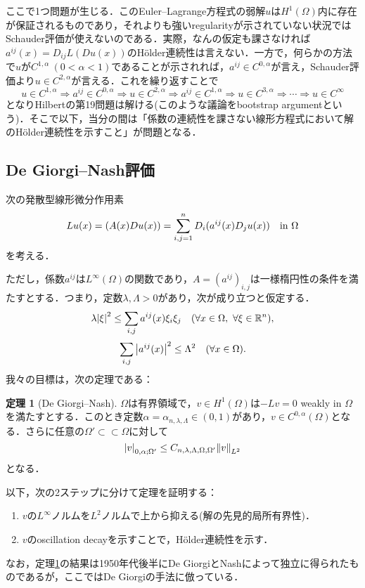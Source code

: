 \documentclass[a4paper]{ltjsarticle}
\newcommand{\Rset}{\mathbb{R}}
\newcommand{\Om}{\Omega}
\newcommand{\ssubset}{\subset\subset}
\newcommand{\inn}{\quad\text{in}\ }
\newcommand{\1}{\mathbbm{1}}
\let\div\relax
\DeclareMathOperator{\div}{\mathrm{div}}
\numberwithin{equation}{section}
\theoremstyle{definition}
\newtheorem{thm}{定理}[section]
\begin{document}
ここで1つ問題が生じる．このEuler--Lagrange方程式の弱解$u$は$H^1(\Om)$内に存在が保証されるものであり，それよりも強いregularityが示されていない状況ではSchauder評価が使えないのである．実際，なんの仮定も課さなければ$a^{ij}(x)=D_{ij}L(Du(x))$のHölder連続性は言えない．一方で，何らかの方法で$u$が$C^{1,\alpha}\ (0<\alpha<1)$であることが示されれば，$a^{ij}\in C^{0,\alpha}$が言え，Schauder評価より$u\in C^{2,\alpha}$が言える．これを繰り返すことで
\begin{equation}
    u\in C^{1,\alpha}\Rightarrow a^{ij}\in C^{0,\alpha}\Rightarrow u\in C^{2,\alpha}\Rightarrow a^{ij}\in C^{1,\alpha}\Rightarrow u\in C^{3,\alpha}\Rightarrow \cdots \Rightarrow u\in C^{\infty}
\end{equation}
となりHilbertの第19問題は解ける(このような議論をbootstrap argumentという)．そこで以下，当分の間は「係数の連続性を課さない線形方程式において解のHölder連続性を示すこと」が問題となる．
\subsection{De Giorgi--Nash評価}
次の発散型線形微分作用素
\begin{equation}
    Lu(x)=\div(A(x)Du(x))=\sum_{i,j=1}^{n}D_i(a^{ij}(x)D_ju(x))\inn \Om
\end{equation}
を考える．

ただし，係数$a^{ij}$は$L^\infty(\Om)$の関数であり，$A=(a^{ij})_{i,j}$は一様楕円性の条件を満たすとする．つまり，定数$\lambda,\Lambda>0$があり，次が成り立つと仮定する．
\begin{equation}
    \lambda\abs{\xi}^2\leq \sum_{i,j}a^{ij}(x)\xi_i\xi_j\quad (\forall x\in\Om,\ \forall \xi\in\Rset^n),
\end{equation}
\begin{equation}
    \sum_{i,j}\abs{a^{ij}(x)}^2\leq \Lambda^2\quad (\forall x\in\Om).
\end{equation}
我々の目標は，次の定理である：
\begin{thm}[De Giorgi--Nash]\label{thm:degiorgi_nash}
    $\Om$は有界領域で，$v\in H^1(\Om)$は$-Lv=0$ weakly in $\Om$を満たすとする．このとき定数$\alpha=\alpha_{n,\lambda,\Lambda}\in (0,1)$があり，$v\in C^{0,\alpha}(\Om)$となる．さらに任意の$\Om'\ssubset \Om$に対して
    \begin{equation}
        \abs{v}_{0,\alpha;\Om'}\leq C_{n,\lambda,\Lambda,\Om,\Om'}\norm{v}_{L^2} 
    \end{equation}
    となる．
\end{thm}
以下，次の2ステップに分けて定理を証明する：
\begin{enumerate}
    \item $v$の$L^\infty$ノルムを$L^2$ノルムで上から抑える(解の先見的局所有界性)．
    \item $v$のoscillation decayを示すことで，Hölder連続性を示す．
\end{enumerate}
なお，定理\ref{thm:degiorgi_nash}の結果は1950年代後半にDe GiorgiとNashによって独立に得られたものであるが，ここではDe Giorgiの手法に倣っている．
\end{document}
